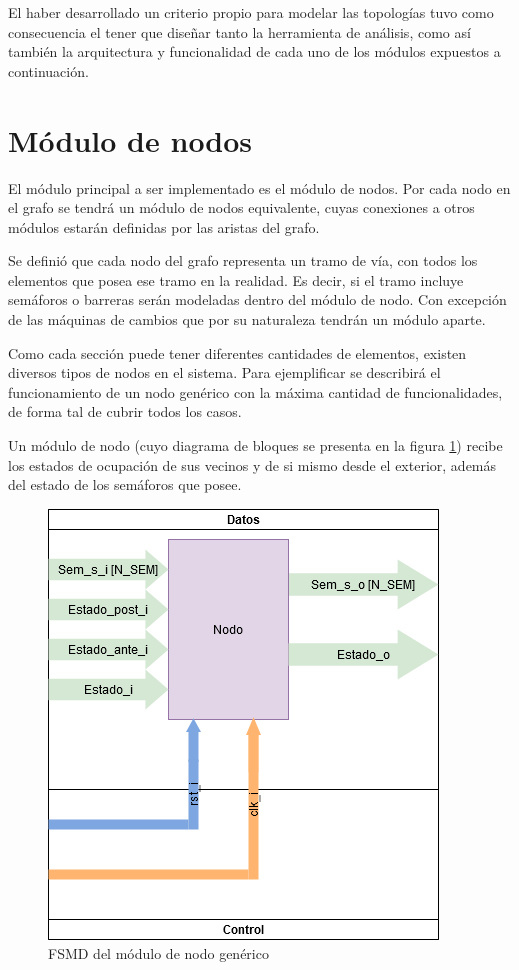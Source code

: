	El haber desarrollado un criterio propio para modelar las topologías tuvo como consecuencia el tener que diseñar tanto la herramienta de análisis, como así también la arquitectura y funcionalidad de cada uno de los módulos expuestos a continuación.	
	
\section{Módulo de nodos}

	El módulo principal a ser implementado es el módulo de nodos. Por cada nodo en el grafo se tendrá un módulo de nodos equivalente, cuyas conexiones a otros módulos estarán definidas por las aristas del grafo.
	
	Se definió que cada nodo del grafo representa un tramo de vía, con todos los elementos que posea ese tramo en la realidad. Es decir, si el tramo incluye semáforos o barreras serán modeladas dentro del módulo de nodo. Con excepción de las máquinas de cambios que por su naturaleza tendrán un módulo aparte.	
	
	Como cada sección puede tener diferentes cantidades de elementos, existen diversos tipos de nodos en el sistema. Para ejemplificar se describirá el funcionamiento de un nodo genérico con la máxima cantidad de funcionalidades, de forma tal de cubrir todos los casos.
	
	Un módulo de nodo (cuyo diagrama de bloques se presenta en la figura \ref{fig:FSMD_Nodo}) recibe los estados de ocupación de sus vecinos y de si mismo desde el exterior, además del estado de los semáforos que posee. 
	
	\begin{figure}[h]
	\centering
	\includegraphics[scale=.5]{./Figures/FSMD-Nodo}
		\caption{FSMD del módulo de nodo genérico}
		\label{fig:FSMD_Nodo}
	\end{figure}		
	
